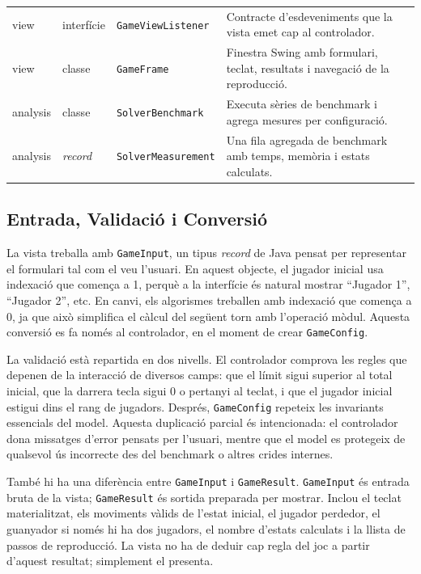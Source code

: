 \documentclass[conference,compsoc]{IEEEtran}
\begin{document}
\begin{table}[t]
\begin{tabular}{@{}lll p{}@{}}
view & interfície & \texttt{GameViewListener} & Contracte d'esdeveniments que la vista emet cap al controlador. \\
view & classe & \texttt{GameFrame} & Finestra Swing amb formulari, teclat, resultats i navegació de la reproducció. \\
analysis & classe & \texttt{SolverBenchmark} & Executa sèries de benchmark i agrega mesures per configuració. \\
analysis & \textit{record} & \texttt{SolverMeasurement} & Una fila agregada de benchmark amb temps, memòria i estats calculats. \\
\bottomrule
\end{tabular}
\end{table}

\subsection{Entrada, Validació i Conversió}

La vista treballa amb \texttt{GameInput}, un tipus \textit{record} de Java pensat
per representar el formulari tal com el veu l'usuari. En aquest objecte, el
jugador inicial usa indexació que comença a 1, perquè a la interfície és natural
mostrar ``Jugador 1'', ``Jugador 2'', etc. En canvi, els algorismes treballen amb
indexació que comença a 0, ja que això simplifica el càlcul del següent torn amb
l'operació mòdul. Aquesta conversió es fa només
al controlador, en el moment de crear \texttt{GameConfig}.

La validació està repartida en dos nivells. El controlador comprova les regles
que depenen de la interacció de diversos camps: que el límit sigui superior al
total inicial, que la darrera tecla sigui 0 o pertanyi al teclat, i que el
jugador inicial estigui dins el rang de jugadors. Després, \texttt{GameConfig}
repeteix les invariants essencials del model. Aquesta duplicació parcial és
intencionada: el controlador dona missatges d'error pensats per l'usuari, mentre
que el model es protegeix de qualsevol ús incorrecte des del benchmark o altres crides internes.

També hi ha una diferència entre \texttt{GameInput} i \texttt{GameResult}.
\texttt{GameInput} és entrada bruta de la vista; \texttt{GameResult} és sortida
preparada per mostrar. Inclou el teclat materialitzat, els moviments vàlids de
l'estat inicial, el jugador perdedor, el guanyador si només hi ha dos jugadors,
el nombre d'estats calculats i la llista de passos de reproducció. La vista no ha de
deduir cap regla del joc a partir d'aquest resultat; simplement el presenta.
\end{document}
